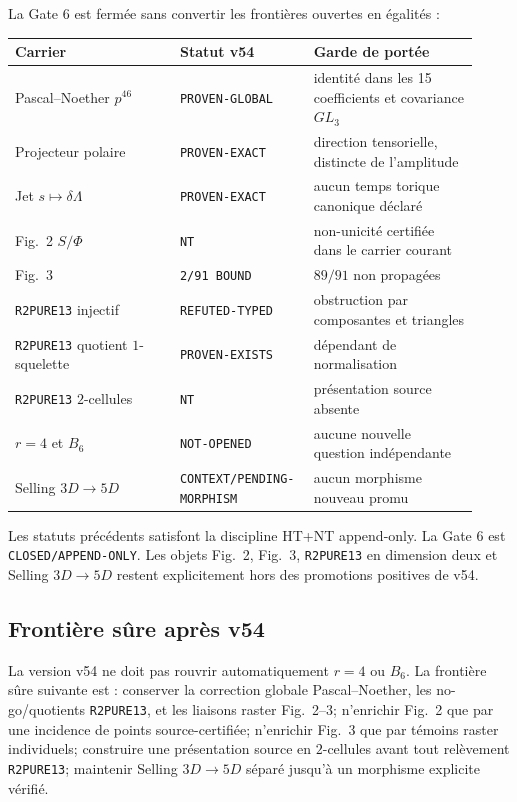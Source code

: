 La Gate 6 est fermée sans convertir les frontières ouvertes en égalités :
\begin{longtable}{p{0.34\linewidth}p{0.24\linewidth}p{0.34\linewidth}}
\toprule
Carrier & Statut v54 & Garde de portée\\
\midrule
\endhead
Pascal--Noether $p^{46}$ & \texttt{PROVEN-GLOBAL} & identité dans les 15 coefficients et covariance $GL_3$\\
Projecteur polaire & \texttt{PROVEN-EXACT} & direction tensorielle, distincte de l'amplitude\\
Jet $s\mapsto\delta\Lambda$ & \texttt{PROVEN-EXACT} & aucun temps torique canonique déclaré\\
Fig.~2 $S/\Phi$ & \texttt{NT} & non-unicité certifiée dans le carrier courant\\
Fig.~3 & \texttt{2/91 BOUND} & $89/91$ non propagées\\
\texttt{R2PURE13} injectif & \texttt{REFUTED-TYPED} & obstruction par composantes et triangles\\
\texttt{R2PURE13} quotient $1$-squelette & \texttt{PROVEN-EXISTS} & dépendant de normalisation\\
\texttt{R2PURE13} $2$-cellules & \texttt{NT} & présentation source absente\\
$r=4$ et $B_6$ & \texttt{NOT-OPENED} & aucune nouvelle question indépendante\\
Selling $3D\to5D$ & \texttt{CONTEXT/}\newline\texttt{PENDING-MORPHISM} & aucun morphisme nouveau promu\\
\bottomrule
\end{longtable}

\begin{proposition}\label{prop:v54-gate6-closed}
Les statuts précédents satisfont la discipline HT+NT append-only. La Gate 6 est
\texttt{CLOSED/APPEND-ONLY}. Les objets Fig.~2, Fig.~3, \texttt{R2PURE13} en dimension deux et
Selling $3D\to5D$ restent explicitement hors des promotions positives de v54.
\end{proposition}

\subsection{Frontière sûre après v54}

La version v54 ne doit pas rouvrir automatiquement $r=4$ ou $B_6$. La frontière sûre suivante est :
conserver la correction globale Pascal--Noether, les no-go/quotients \texttt{R2PURE13}, et les
liaisons raster Fig.~2--3; n'enrichir Fig.~2 que par une incidence de points source-certifiée;
n'enrichir Fig.~3 que par témoins raster individuels; construire une présentation source en
$2$-cellules avant tout relèvement \texttt{R2PURE13}; maintenir Selling $3D\to5D$ séparé jusqu'à
un morphisme explicite vérifié.

